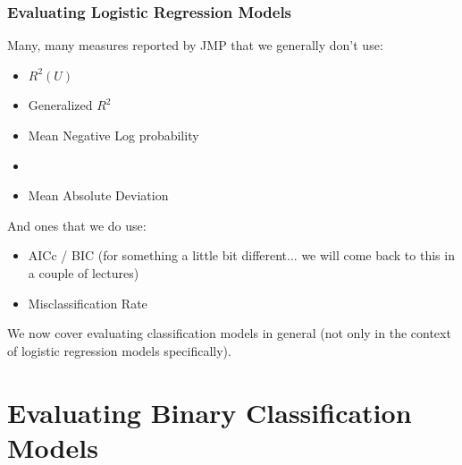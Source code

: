 \documentclass[handout]{beamer}
\begin{document}
\begin{frame}\frametitle{Evaluating Logistic Regression Models}

Many, many measures reported by JMP that we generally don't use: \pause

\begin{itemize}
\item $R^2(U)$
\item Generalized $R^2$
\item Mean Negative Log probability
\item {}
\item Mean Absolute Deviation \pause
\end{itemize}

And ones that we do use:

\begin{itemize}
\item AICc / BIC (for something a little bit different... we will come back to this in a couple of lectures) \pause
\item Misclassification Rate \pause
\end{itemize}

We now cover evaluating classification models in general (not only in the context of logistic regression models specifically).

\end{frame}

\section{Evaluating Binary Classification Models}
\end{document}
